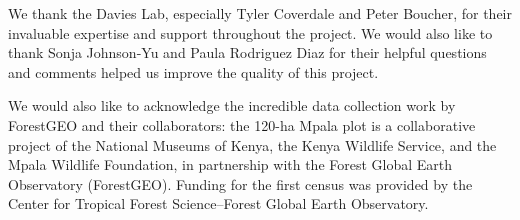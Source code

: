 \documentclass[letterpaper]{article} %
\begin{document}
We thank the Davies Lab, especially Tyler Coverdale and Peter Boucher, for their invaluable expertise and support throughout the project. We would also like to thank Sonja Johnson-Yu and Paula Rodriguez Diaz for their helpful questions and comments helped us improve the quality of this project.

We would also like to acknowledge the incredible data collection work by ForestGEO and their collaborators: the 120-ha Mpala plot is a collaborative project of the National Museums of Kenya, the Kenya Wildlife Service, and the Mpala Wildlife Foundation, in partnership with the Forest Global Earth Observatory (ForestGEO). Funding for the first census was provided by the Center for Tropical Forest Science--Forest Global Earth Observatory.


\end{document}
